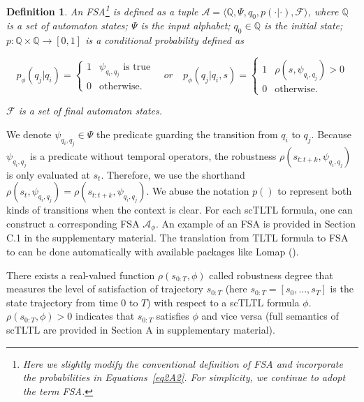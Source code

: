 \documentclass{article}
\newtheorem{definition}{Definition}
\newcommand{\Always}{\Box}
\begin{document}

\begin{definition}\label{def1} 
An FSA\footnote{Here we slightly modify the conventional definition of FSA and incorporate the probabilities in Equations~\eqref{eq2A2}. For simplicity, we continue to adopt the term FSA.} is defined as a tuple  $\mathcal{A}=\langle \mathbb{Q}, \Psi, q_0, p(\cdot | \cdot), \mathcal{F} \rangle $, where $\mathbb{Q}$ is a set of automaton states; $\Psi$ is the input alphabet; $q_0 \in \mathbb{Q}$ is the initial state; $p:\mathbb{Q} \times \mathbb{Q} \rightarrow [0,1]$ is a conditional probability defined as 

\begin{equation}\label{eq2A2}
p_\phi(q_j | q_i) = \begin{cases}
1 & \psi_{q_i, q_j} \textrm{ is true} \\
 0 & \text{otherwise}.
 \end{cases} 
 \quad or \quad 
p_\phi(q_j | q_i, s) = \begin{cases}
1 & \rho(s,\psi_{q_i, q_j})>0\\
 0 & \text{otherwise}.
 \end{cases} 
\end{equation}

\noindent $\mathcal{F}$ is a set of final automaton states.

\end{definition}

We denote $\psi_{q_i, q_j} \in \Psi$ the predicate guarding the transition from $q_i$ to $q_j$. Because $\psi_{q_i, q_j}$ is a predicate without temporal operators, the robustness $\rho(s_{t:t+k}, \psi_{q_i, q_j})$ is only evaluated at $s_t$. Therefore, we use the shorthand $\rho(s_{t}, \psi_{q_i, q_j}) = \rho(s_{t:t+k}, \psi_{q_i, q_j})$. We abuse the notation $p()$ to represent both kinds of transitions when the context is clear. For each scTLTL formula, one can construct a corresponding FSA $\mathcal{A}_\phi$. An example of an FSA is provided in Section C.1 in the supplementary material. The translation from TLTL formula to FSA to can be done automatically with available packages like Lomap (\cite{lomap}). 

There exists a real-valued function $\rho(s_{0:T}, \phi)$ called robustness degree that measures the level of satisfaction of trajectory $s_{0:T}$ (here $s_{0:T}=[s_0, ..., s_T]$ is the state trajectory from time 0 to $T$) with respect to a scTLTL formula $\phi$. $\rho(s_{0:T}, \phi)>0$ indicates that $s_{0:T}$ satisfies $\phi$ and vice versa (full semantics of scTLTL are provided in Section A in supplementary material).
\end{document}
